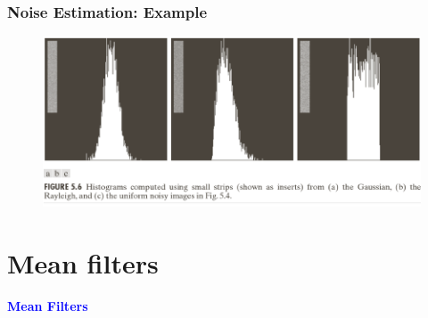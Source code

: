 \documentclass[english,11pt,table,handout]{beamer}
\begin{document}
\frame
{
	\frametitle{Noise Estimation: Example}
	\begin{example}
		\begin{figure}[!h]
			\includegraphics[scale=0.6]{noise_strip.png}
		\end{figure}
	\end{example}
	
}

\section{Mean filters}
\frame
{
	\Huge
	\begin{center}
		\textcolor{blue}{\textbf{Mean Filters}}
	\end{center}
}
\end{document}
